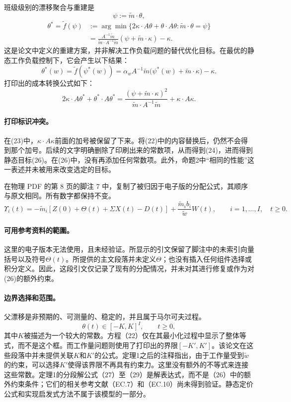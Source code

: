 \documentclass[11pt]{article}
\begin{document}
班级级别的漂移聚合与重建是
\[
\psi:=\tilde m\cdot\theta,
\]
\begin{equation}
\begin{aligned}
\theta^*=\tilde f(\psi)
&:=\arg\min\{2\kappa\cdot A\theta+\theta\cdot A\theta:
                 \tilde m\cdot\theta=\psi\}\\
&=\frac{A^{-1}\tilde m}{\tilde m\cdot A^{-1}\tilde m}
(\psi+\tilde m\cdot\kappa)-\kappa.
\end{aligned}
\tag{22}
\end{equation}
这是论文中定义的重建方案，并非解决工作负载问题的替代优化目标。在最优的静态工作负载控制下，它会产生以下结果：
\begin{equation}
\theta^*(w)=\tilde f(\psi^*(w))
=\alpha_w A^{-1}\tilde m\bigl(\psi^*(w)+\tilde m\cdot\kappa\bigr)-\kappa.
\tag{30}
\end{equation}
打印出的成本转换公式如下：
\begin{equation}
2\kappa\cdot A\theta^*+\theta^*\cdot A\theta^*
=\frac{(\psi+\tilde m\cdot\kappa)^2}{\tilde m\cdot A^{-1}\tilde m}
+\kappa\cdot A\kappa.
\tag{23}
\end{equation}
\paragraph{打印标识冲突。}
在(23)中，\(\kappa\cdot A\kappa\)前面的加号被保留了下来。将(22)中的内容替换后，仍然不会得到那个加号。后续的文字明确删除了印刷出来的常数项，从而得到(24)，进而得到静态目标(26)。在(26)中，没有再添加任何常数项。此外，命题2中“相同的性能”这一表述并未被用来改变选定的目标。

在物理 PDF 的第 8 页的脚注 7 中，复制了被归因于电子版的分配公式，其顺序与原文相同。所有数字都保持不变。
\begin{equation}
\Upsilon_i(t)=-\tilde m_i[Z(0)+\Theta(t)+\Sigma X(t)-D(t)]
+\frac{\tilde m_i b_i}{\tilde w}W(t),
\qquad i=1,\ldots,I,\quad t\geq0.
\tag{EC.1, as quoted}
\end{equation}
\paragraph{可用参考资料的範圍。}
这里的电子版本无法使用，且未经验证。所显示的引文保留了脚注中的未索引向量括号以及符号\(\Theta(t)\)。所提供的主文段落并未定义\(\Theta\)；也没有插入任何组件选择或积分定义。因此，这段引文仅记录了现有的分配情况，并未对其进行修复或作为对(26)的额外约束。

\paragraph{边界选择和范围。}
父漂移是非预期的、可测量的、稳定的，并且属于马尔可夫过程。
\[
\theta(t)\in[-K,K]^I,\qquad t\geq0,
\]
其中\(K\)被描述为一个较大的常数。方程（22）仅在其最小化过程中显示了整体等式，而不是这个框。而工作量问题则使用了打印出的界限\([-K',K']\)。该论文在这些段落中并未提供关联\(K\)和\(K'\)的公式。定理1之后的注释指出，由于工作量受到\(\tilde w\)的约束，可以选择\(K'\)使得该界限不再具有约束力。这里没有额外的不等式来连接这些常数。定理1的分段解公式（27）至（29）是解表达式，而不是（26）中的额外约束条件；它们的相关参考文献（EC.7）和（EC.10）尚未得到验证。静态定价公式和实现启发式方法不属于该模型的一部分。
\end{document}
